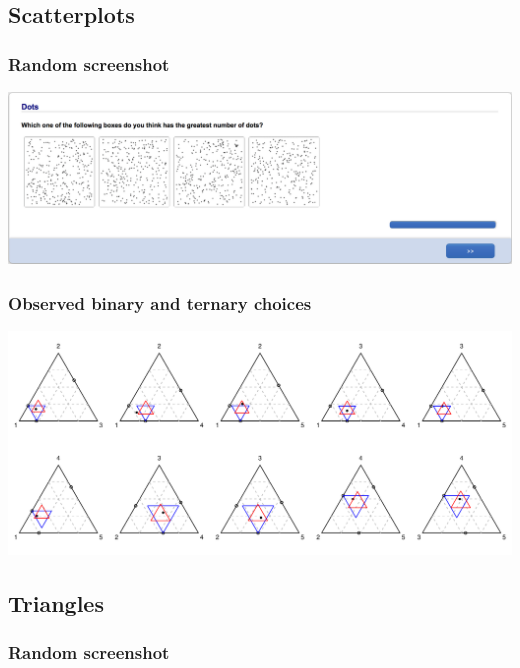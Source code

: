 \documentclass[11pt,letter]{article}
\begin{document}
\pagebreak

\subsection*{Scatterplots}



\subsubsection*{Random screenshot}

\includegraphics[width=15cm]{Population_study_design/screenshot_Dots.png}

\subsubsection*{Observed binary and ternary choices}

\includegraphics[width=15cm]{./Population_study_data/Simplexes/Dots.pdf}

\pagebreak

\subsection*{Triangles}



\subsubsection*{Random screenshot}
\end{document}
